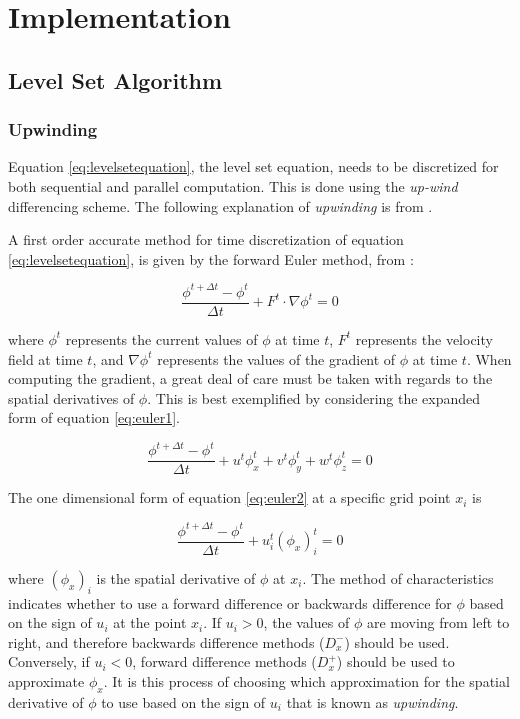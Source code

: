 \chapter{Implementation}

\section{Level Set Algorithm}\label{levelsetalgorithm}

\subsection{Upwinding}
Equation \eqref{eq:levelsetequation}, the level set equation, needs to be discretized for both sequential and parallel computation. This is done using the \textit{up-wind} differencing scheme. The following explanation of \textit{upwinding} is from \cite{osher2003lsm}.

A first order accurate method for time discretization of equation \eqref{eq:levelsetequation}, is given by the forward Euler method, from \cite{osher2003lsm}:

\begin{equation}
\frac{\phi^{t+\Delta t}-\phi^t}{\Delta t} +F^{t}\cdot{\nabla{\phi^{t}}} = 0
\label{eq:euler1}
\end{equation}

where $\phi^{t}$ represents the current values of $\phi$ at time $t$, $F^{t}$ represents the velocity field at time $t$, and  $\nabla{\phi^{t}}$ represents the values of the gradient of $\phi$ at time $t$. When computing the gradient, a great deal of care must be taken with regards to the spatial derivatives of $\phi$. This is best exemplified by considering the expanded form of equation \eqref{eq:euler1}.

\begin{equation}
\frac{\phi^{t+\Delta t}-\phi^t}{\Delta t} +u^{t}\phi_x^t+v^{t}\phi_y^t+w^{t}\phi_z^t = 0
\label{eq:euler2}
\end{equation}

The one dimensional form of equation \eqref{eq:euler2} at a specific grid point $x_i$ is

\begin{equation}
\frac{\phi^{t+\Delta t}-\phi^t}{\Delta t} +u_i^{t}(\phi_x)_i^t = 0
\label{eq:euler3}
\end{equation}

where $(\phi_x)_i$ is the spatial derivative of $\phi$ at $x_i$. The method of characteristics indicates whether to use a forward difference or backwards difference for $\phi$ based on the sign of $u_i$ at the point $x_i$. If $u_i > 0$, the values of $\phi$ are moving from left to right, and therefore backwards difference methods ($D_x^-$) should be used. Conversely, if $u_i<0$, forward difference methods ($D_x^+$) should be used to approximate $\phi_x$. It is this process of choosing which approximation for the spatial derivative of $\phi$ to use based on the sign of $u_i$ that is known as \textit{upwinding}.

